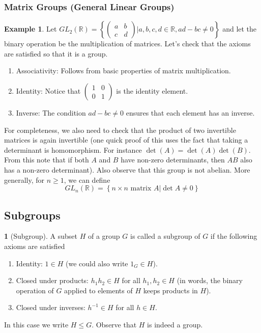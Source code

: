 \documentclass[12pt]{article}
\theoremstyle{definition}
\newtheorem{definition}{\color{NavyBlue}{\textbf{Definition}}}
\newtheorem{example}{\color{WildStrawberry}Example}
\theoremstyle{definition}
\begin{document}
\subsubsection{Matrix Groups (General Linear Groups)}
\begin{example}
Let $GL_2(\mathbb{R}) = \left\{ \begin{pmatrix} a & b \\ c & d \end{pmatrix} \Big\vert a,b,c,d \in \mathbb{R}, ad-bc \neq 0 \right\}$ and let the binary operation be the multiplication of matrices. Let's check that the axioms are satisfied so that it is a group.
\begin{enumerate}
\item Associativity: Follows from basic properties of matrix multiplication. 
\item Identity: Notice that $\begin{pmatrix} 1 & 0 \\ 0 & 1 \end{pmatrix}$ is the identity element.
\item Inverse: The condition $ad-bc \neq 0$ ensures that each element has an inverse.
\end{enumerate}
For completeness, we also need to check that the product of two invertible matrices is again invertible (one quick proof of this uses the fact that taking a determinant is homomorphism. For instance $\det(A) = \det(A)\det(B)$. From this note that if both $A$ and $B$ have non-zero determinants, then $AB$ also has a non-zero determinant). Also observe that this group is not abelian. More generally, for $n\geq 1$, we can define
\begin{equation}
GL_n(\mathbb{R}) = \left\{ n\times n \text{ matrix } A \Big\vert \det{A} \neq 0 \right\}
\end{equation}
\end{example}

\subsection{Subgroups}
\begin{definition}[Subgroup]
A subset $H$ of a group $G$ is called a subgroup of $G$ if the following axioms are satisfied
\begin{enumerate}
\item Identity: $1 \in H$ (we could also write $1_G \in H$).
\item Closed under products: $h_1 h_2 \in H$ for all $h_1, h_2 \in H$ (in words, the binary operation of $G$ applied to elements of $H$ keeps products in $H$). 
\item Closed under inverses: $h^{-1} \in H$ for all $h\in H$. 
\end{enumerate}
In this case we write $H \leq G$. Observe that $H$ is indeed a group.
\end{definition}
\end{document}
